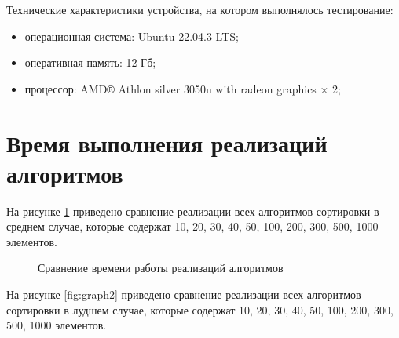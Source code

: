 Технические характеристики устройства, на котором выполнялось тестирование:

\begin{itemize}
	\item операционная система: Ubuntu 22.04.3 LTS;
	\item оперативная память: 12 Гб;
	\item процессор: AMD® Athlon silver 3050u with radeon graphics × 2;
\end{itemize}

\section{Время выполнения реализаций алгоритмов}

На рисунке \ref{fig:graph1} приведено сравнение реализации всех алгоритмов сортировки в среднем случае, которые содержат 10, 20, 30, 40, 50, 100, 200, 300, 500, 1000 элементов.

\begin{figure}[ht!]
	\begin{center}
		\captionsetup{singlelinecheck = false, justification=centerfirst}
		\centering
		\caption{Сравнение времени работы реализаций алгоритмов}
		\label{fig:graph1}
	\end{center}
\end{figure}
\clearpage

На рисунке \ref{fig:graph2} приведено сравнение реализации всех алгоритмов сортировки в лудшем случае, которые содержат 10, 20, 30, 40, 50, 100, 200, 300, 500, 1000 элементов.

